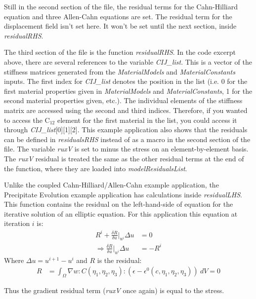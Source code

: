 \documentclass[10pt]{article} %
\begin{document}
Still in the second section of the file, the residual terms for the Cahn-Hilliard equation and three Allen-Cahn equations are set. The residual term for the displacement field isn't set here. It won't be set until the next section, inside \emph{residualRHS}.

The third section of the file is the function \emph{residualRHS}. In the code excerpt above, there are several references to the variable \emph{CIJ\_list}. This is a vector of the stiffness matrices generated from the \emph{MaterialModels} and \emph{MaterialConstants} inputs. The first index for \emph{CIJ\_list} denotes the position in the list (i.e. 0 for the first material properties given in \emph{MaterialModels} and \emph{MaterialConstants}, 1 for the second material properties given, etc.). The individual elements of the stiffness matrix are accessed using the second and third indices. Therefore, if you wanted to access the C$_{12}$ element for the first material in the list, you could access it through \emph{CIJ\_list}[0][1][2]. This example application also shows that the residuals can be defined in \emph{residualsRHS} instead of as a macro in the second section of the file. The variable \emph{ruxV} is set to minus the stress on an element-by-element basis. The \emph{ruxV} residual is treated the same as the other residual terms at the end of the function, where they are loaded into \emph{modelResidualsList}.

Unlike the coupled Cahn-Hilliard/Allen-Cahn example application, the Precipitate Evolution example application has calculations inside \emph{residualLHS}.  This function contains the residual on the left-hand-side of equation for the iterative solution of an elliptic equation. For this application this equation at iteration $i$ is: 
\begin{align}
R^i + \frac{\delta R}{\delta u} \bigg|_{u^i} \Delta u &= 0 \\
\Rightarrow \frac{\delta R}{\delta u}\bigg|_{u^i} \Delta u &= -R^i
\end{align}
Where $\Delta u = u^{i+1}-u^i$ and $R$ is the residual:
\begin{align}
R &=  \int_{\Omega}   \nabla w :  C(\eta_1, \eta_2, \eta_3) : \left( \epsilon - \epsilon^0(c,\eta_1, \eta_2, \eta_3)\right) ~dV = 0 
\end{align}

Thus the gradient residual term (\emph{ruxV} once again) is equal to the stress.
\end{document}
